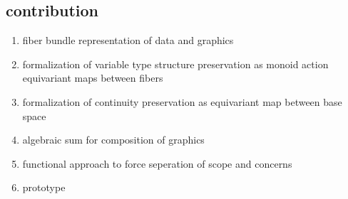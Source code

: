 \documentclass[../main.tex]{subfiles}
\begin{document}
\subsection{contribution}

\begin{enumerate}
    \item fiber bundle representation of data and graphics
    \item formalization of variable type structure preservation as monoid action equivariant maps between fibers 
    \item formalization of continuity preservation as equivariant map between base space
    \item algebraic sum for composition of graphics
    \item functional approach to force seperation of scope and concerns
    \item prototype  
\end{enumerate}
\end{document}
